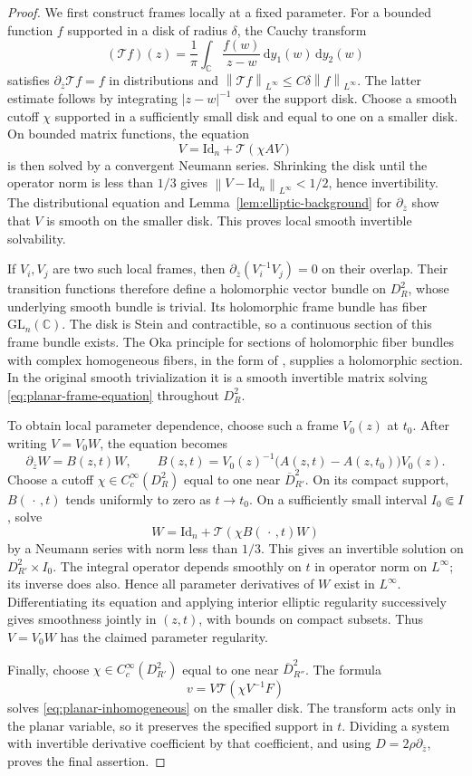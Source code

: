 \documentclass[11pt]{article}
\newcommand{\C}{\mathbb C}
\newcommand{\dd}{\mathrm d}
\newcommand{\Id}{\mathrm{Id}}
\newcommand{\norm}[1]{\left\lVert #1\right\rVert}
\newcommand{\abs}[1]{\left\lvert #1\right\rvert}
\theoremstyle{remark}
\numberwithin{equation}{section}
\begin{document}
\begin{proof}
We first construct frames locally at a fixed parameter. For a
bounded function $f$ supported in a disk of radius $\delta$, the
Cauchy transform
\[
 (\mathcal Tf)(z)=\frac1\pi
       \int_{\C}\frac{f(w)}{z-w}\,\dd y_1(w)\,\dd y_2(w)
\]
satisfies $\partial_{\overline z}\mathcal Tf=f$ in distributions
and $\norm{\mathcal Tf}_{L^\infty}\le C\delta\norm f_{L^\infty}$.
The latter estimate follows by integrating $\abs{z-w}^{-1}$ over
the support disk. Choose a smooth cutoff $\chi$ supported in a
sufficiently small disk and equal to one on a smaller disk. On
bounded matrix functions, the equation
\[
 V=\Id_n+\mathcal T(\chi A V)
\]
is then solved by a convergent Neumann series. Shrinking the disk
until the operator norm is less than $1/3$ gives
$\norm{V-\Id_n}_{L^\infty}<1/2$, hence invertibility. The
distributional equation and Lemma~\ref{lem:elliptic-background} for
$\partial_{\overline z}$ show that $V$ is smooth on the smaller
disk. This proves local smooth invertible solvability.

If $V_i,V_j$ are two such local frames, then
$\partial_{\overline z}(V_i^{-1}V_j)=0$ on their overlap.
Their transition functions therefore define a holomorphic vector
bundle on $D_R^2$, whose underlying smooth bundle is trivial.
Its holomorphic frame bundle has fiber $\mathrm{GL}_n(\C)$.
The disk is Stein and contractible, so a continuous section of
this frame bundle exists. The Oka principle for sections of holomorphic
fiber bundles with complex homogeneous fibers, in the form of
\cite[Theorem~1.1, p.~1018]{Forstneric2009}, supplies a holomorphic
section. In the original smooth trivialization it is
a smooth invertible matrix solving
\eqref{eq:planar-frame-equation} throughout $D_R^2$.

To obtain local parameter dependence, choose such a frame $V_0(z)$
at $t_0$. After writing $V=V_0W$, the equation becomes
\[
 \partial_{\overline z}W=B(z,t)W,
 \qquad
 B(z,t)=V_0(z)^{-1}\bigl(A(z,t)-A(z,t_0)\bigr)V_0(z).
\]
Choose a cutoff $\chi\in C_c^\infty(D_R^2)$ equal to one near
$\overline D_{R'}^2$. On its compact support, $B(\,\cdot\,,t)$
tends uniformly to zero as $t\to t_0$. On a sufficiently small
interval $I_0\Subset I$, solve
\[
 W=\Id_n+\mathcal T(\chi B(\,\cdot\,,t)W)
\]
by a Neumann series with norm less than $1/3$. This gives an
invertible solution on $D_{R'}^2\times I_0$. The integral operator
depends smoothly on $t$ in operator norm on $L^\infty$; its
inverse does also. Hence all parameter derivatives of $W$ exist
in $L^\infty$. Differentiating its equation and applying interior
elliptic regularity successively gives smoothness jointly in
$(z,t)$, with bounds on compact subsets. Thus $V=V_0W$ has the
claimed parameter regularity.

Finally, choose $\chi\in C_c^\infty(D_{R'}^2)$ equal to one near
$\overline D_{R''}^2$. The formula
\[
 v=V\mathcal T(\chi V^{-1}F)
\]
solves \eqref{eq:planar-inhomogeneous} on the smaller disk.
The transform acts only in the planar variable, so it preserves
the specified support in $t$. Dividing a system with invertible
derivative coefficient by that coefficient, and using
$D=2\rho\partial_{\overline z}$, proves the final assertion.
\end{proof}
\end{document}
